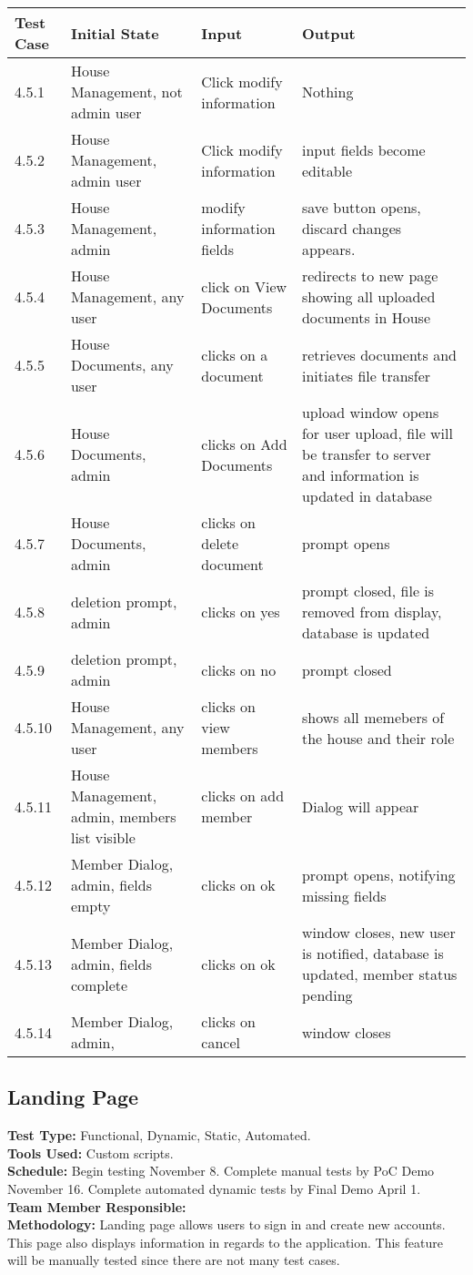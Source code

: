 \documentclass[12pt]{article}
\begin{document}
\begin{longtable}{|p{2cm}|p{3cm}|p{5cm}|p{5cm}|}
\hline
\textbf{Test Case}  & \textbf{Initial State} & \textbf{Input} & \textbf{Output} \\ \hline
4.5.1 & House Management, not admin user & Click modify information & Nothing\\ 
\hline
4.5.2 & House Management, admin user & Click modify information & input fields become editable \\
\hline
4.5.3 & House Management, admin & modify information fields & save button opens, discard changes appears. \\
\hline
4.5.4 & House Management, any user & click on View Documents  & redirects to new page showing all uploaded documents in House \\
\hline
4.5.5 & House Documents, any user & clicks on a document & retrieves documents and initiates file transfer\\
\hline
4.5.6 & House Documents, admin & clicks on Add Documents & upload window opens for user upload, file will be transfer to server and information is updated in database\\
\hline
4.5.7 & House Documents, admin & clicks on delete document & prompt opens\\
\hline
4.5.8 & deletion prompt, admin & clicks on yes & prompt closed, file is removed from display, database is updated\\
\hline
4.5.9 & deletion prompt, admin & clicks on no & prompt closed\\
\hline
4.5.10 & House Management, any user & clicks on view members & shows all memebers of the house and their role\\
\hline
4.5.11 & House Management, admin, members list visible & clicks on add member & Dialog will appear\\
\hline
4.5.12 & Member Dialog, admin, fields empty & clicks on ok & prompt opens, notifying missing fields \\
\hline
4.5.13 & Member Dialog, admin, fields complete & clicks on ok & window closes, new user is notified, database is updated, member status pending\\
\hline
4.5.14 & Member Dialog, admin, & clicks on cancel & window closes\\
\hline
\end{longtable}

\subsection{Landing Page}
\textbf{Test Type:} Functional, Dynamic, Static, Automated. \\
\textbf{Tools Used:} Custom scripts. \\
\textbf{Schedule:} Begin testing November 8. Complete manual tests by PoC Demo November 16. Complete automated dynamic tests by Final Demo April 1. \\
\textbf{Team Member Responsible:} \\
\textbf{Methodology:} Landing page allows users to sign in and create new accounts. This page also displays information in regards to the application. This feature will be manually tested since there are not many test cases.
\end{document}
